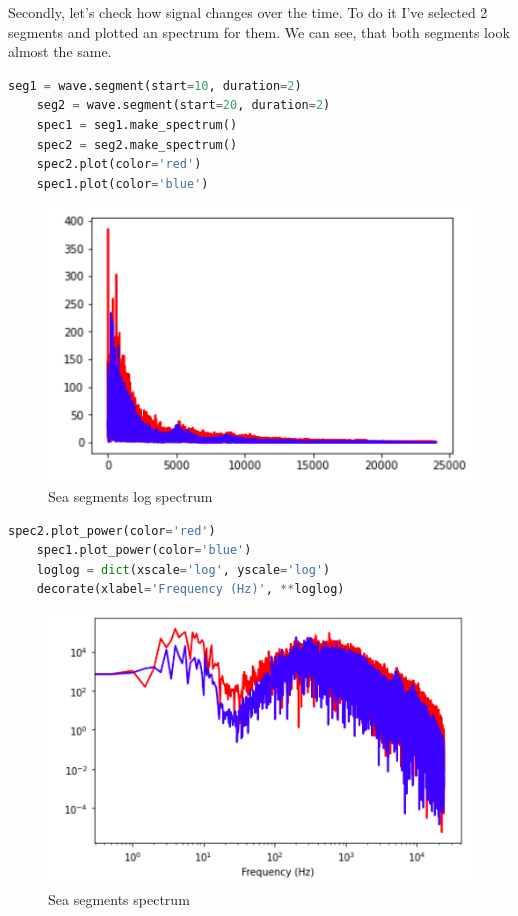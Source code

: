 \documentclass[a4paper]{article}
\begin{document}
        Secondly, let's check how signal changes over the time. To do it I've selected 2 segments and plotted an spectrum for them. We can see, that both segments look almost the same.
        \begin{lstlisting}[language=Python,caption=Segments spectrum,label={lst:part1_3}]
    seg1 = wave.segment(start=10, duration=2)
    seg2 = wave.segment(start=20, duration=2)
    spec1 = seg1.make_spectrum()
    spec2 = seg2.make_spectrum()
    spec2.plot(color='red')
    spec1.plot(color='blue')
        \end{lstlisting}
        \begin{figure}[H]
            \centering
            \includegraphics[width=\textwidth]{img/sea_seg.png}
            \caption{Sea segments log spectrum}
            \label{fig:part1_1_3}
        \end{figure}
        \begin{lstlisting}[language=Python,caption=Log spectrum of segments,label={lst:part1_4}]
    spec2.plot_power(color='red')
    spec1.plot_power(color='blue')
    loglog = dict(xscale='log', yscale='log')
    decorate(xlabel='Frequency (Hz)', **loglog)
        \end{lstlisting}
        \begin{figure}[H]
            \centering
            \includegraphics[width=\textwidth]{img/sea_seg_log.png}
            \caption{Sea segments spectrum}
            \label{fig:part1_1_4}
        \end{figure}
        
\end{document}
